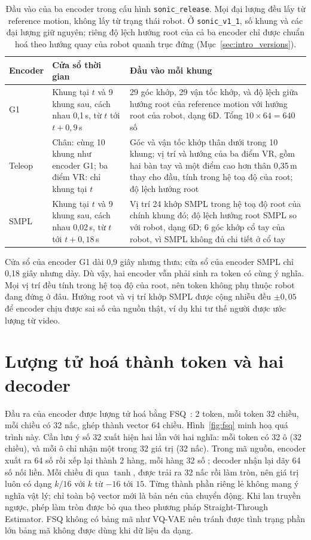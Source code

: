 \documentclass[12pt,a4paper,oneside]{report}
\newcommand{\code}[1]{\texttt{#1}}
\begin{document}
\begin{table}[htbp]
\centering\footnotesize
\caption[Đầu vào của ba encoder trong cấu hình \code{sonic\_release}]{Đầu vào của ba encoder trong cấu hình \code{sonic\_release}. Mọi đại lượng đều lấy từ reference motion, không lấy từ trạng thái robot. Ở \code{sonic\_v1\_1}, số khung và các đại lượng giữ nguyên; riêng độ lệch hướng root của cả ba encoder chỉ được chuẩn hoá theo hướng quay của robot quanh trục đứng (Mục~\ref{sec:intro_versions}).}
\label{tab:enc_input}
\begin{tabular}{L{2cm}L{3.2cm}L{9.2cm}}
\toprule
\textbf{Encoder} & \textbf{Cửa sổ thời gian} & \textbf{Đầu vào mỗi khung}\\
\midrule
G1 & Khung tại $t$ và 9 khung sau, cách nhau 0,1\,s, từ $t$ tới $t+0{,}9$\,s & 29 góc khớp, 29 vận tốc khớp, và độ lệch giữa hướng root của reference motion với hướng root của robot, dạng 6D. Tổng $10 \times 64 = 640$ số\\
Teleop & Chân: cùng 10 khung như encoder G1; ba điểm VR: chỉ khung tại $t$ & Góc và vận tốc khớp thân dưới trong 10 khung; vị trí và hướng của ba điểm VR, gồm hai bàn tay và một điểm cao hơn thân 0,35\,m thay cho đầu, tính trong hệ toạ độ của root; độ lệch hướng root\\
SMPL & Khung tại $t$ và 9 khung sau, cách nhau 0,02\,s, từ $t$ tới $t+0{,}18$\,s & Vị trí 24 khớp SMPL trong hệ toạ độ root của chính khung đó; độ lệch hướng root SMPL so với robot, dạng 6D; 6 góc khớp cổ tay của robot, vì SMPL không đủ chi tiết ở cổ tay\\
\bottomrule
\end{tabular}
\end{table}

Cửa sổ của encoder G1 dài 0,9 giây nhưng thưa; cửa sổ của encoder SMPL chỉ 0,18 giây nhưng dày. Dù vậy, hai encoder vẫn phải sinh ra token có cùng ý nghĩa. Mọi vị trí đều tính trong hệ toạ độ của root, nên token không phụ thuộc robot đang đứng ở đâu. Hướng root và vị trí khớp SMPL được cộng nhiễu đều $\pm 0{,}05$ để encoder chịu được sai số của nguồn thật, ví dụ khi tư thế người được ước lượng từ video.

\section{Lượng tử hoá thành token và hai decoder}
\label{sec:token}

Đầu ra của encoder được lượng tử hoá bằng FSQ~\cite{fsq}: 2 token, mỗi token 32 chiều, mỗi chiều có 32 nấc, ghép thành vector 64 chiều. Hình~\ref{fig:fsq} minh hoạ quá trình này. Cần lưu ý số 32 xuất hiện hai lần với hai nghĩa: mỗi token có 32 ô (32 chiều), và mỗi ô chỉ nhận một trong 32 giá trị (32 nấc). Trong mã nguồn, encoder xuất ra 64 số rồi xếp lại thành 2 hàng, mỗi hàng 32 số ; decoder nhận lại dãy 64 số nối liền. Mỗi chiều đi qua $\tanh$, được trải ra 32 nấc rồi làm tròn, nên giá trị luôn có dạng $k/16$ với $k$ từ $-16$ tới $15$. Từng thành phần riêng lẻ không mang ý nghĩa vật lý; chỉ toàn bộ vector mới là bản nén của chuyển động. Khi lan truyền ngược, phép làm tròn được bỏ qua theo phương pháp Straight-Through Estimator. FSQ không có bảng mã như VQ-VAE nên tránh được tình trạng phần lớn bảng mã không được dùng khi dữ liệu đa dạng.
\end{document}
